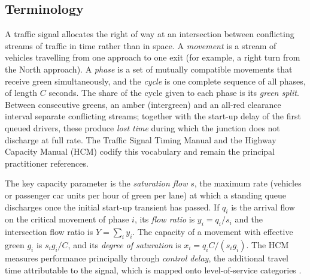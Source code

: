 \subsection{Terminology}
A traffic signal allocates the right of way at an intersection between conflicting streams of traffic in time
rather than in space. A \emph{movement} is a stream of vehicles travelling from one approach to one exit (for
example, a right turn from the North approach). A \emph{phase} is a set of mutually compatible movements that
receive green simultaneously, and the \emph{cycle} is one complete sequence of all phases, of length $C$
seconds. The share of the cycle given to each phase is its \emph{green split}. Between consecutive greens, an
amber (intergreen) and an all-red clearance interval separate conflicting streams; together with the start-up
delay of the first queued drivers, these produce \emph{lost time} during which the junction does not discharge
at full rate. The Traffic Signal Timing Manual \cite{koonce2008timing} and the Highway Capacity Manual (HCM)
\cite{hcm2016} codify this vocabulary and remain the principal practitioner references.

The key capacity parameter is the \emph{saturation flow} $s$, the maximum rate (vehicles or passenger car units
per hour of green per lane) at which a standing queue discharges once the initial start-up transient has
passed. If $q_i$ is the arrival flow on the critical movement of phase $i$, its \emph{flow ratio} is
$y_i = q_i/s_i$ and the intersection flow ratio is $Y=\sum_i y_i$. The capacity of a movement with effective green
$g_i$ is $s_i g_i / C$, and its \emph{degree of saturation} is $x_i = q_i C/(s_i g_i)$. The HCM measures performance
principally through \emph{control delay}, the additional travel time attributable to the signal, which is
mapped onto level-of-service categories \cite{hcm2016}.

